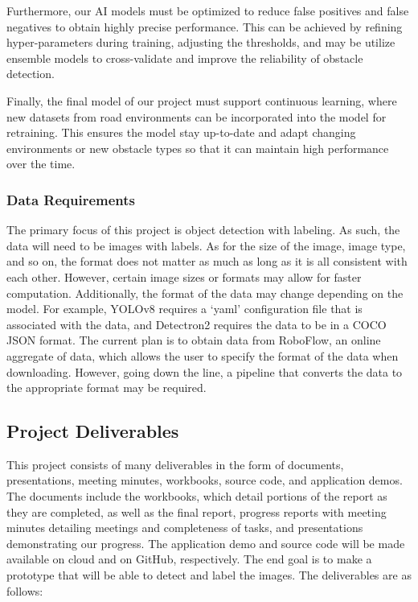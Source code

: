 \documentclass[stu,12pt,floatsintext]{apa7}
\begin{document}
Furthermore, our AI models must be optimized to reduce false positives and false negatives to obtain highly precise performance. This can be achieved by refining hyper-parameters during training, adjusting the thresholds, and may be utilize ensemble models to cross-validate and improve the reliability of obstacle detection.

Finally, the final model of our project must support continuous learning, where new datasets from road environments can be incorporated into the model for retraining. This ensures the model stay up-to-date and adapt changing environments or new obstacle types so that it can maintain high performance over the time.

\subsubsection{Data Requirements}
The primary focus of this project is object detection with labeling. As such, the data will need to be images with labels. As for the size of the image, image type, and so on, the format does not matter as much as long as it is all consistent with each other. However, certain image sizes or formats may allow for faster computation. Additionally, the format of the data may change depending on the model. For example, YOLOv8 requires a `yaml' configuration file that is associated with the data, and Detectron2 requires the data to be in a COCO JSON format. The current plan is to obtain data from RoboFlow, an online aggregate of data, which allows the user to specify the format of the data when downloading. However, going down the line, a pipeline that converts the data to the appropriate format may be required.

\subsection{Project Deliverables}
This project consists of many deliverables in the form of documents, presentations, meeting minutes, workbooks, source code, and application demos. The documents include the workbooks, which detail portions of the report as they are completed, as well as the final report, progress reports with meeting minutes detailing meetings and completeness of tasks, and presentations demonstrating our progress. The application demo and source code will be made available on cloud and on GitHub, respectively. The end goal is to make a prototype that will be able to detect and label the images.
The deliverables are as follows:
\end{document}
